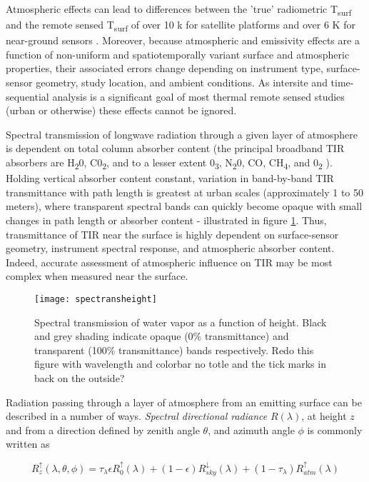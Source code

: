 Atmospheric effects can lead to differences between the 'true' radiometric T\textsubscript{surf} and the remote sensed T\textsubscript{surf} of over 10 k for satellite platforms \cite{Cooper1989} and over 6 K for near-ground sensors \cite{Meier2011}. Moreover, because atmospheric and emissivity effects are a function of non-uniform and spatiotemporally variant surface and atmospheric properties, their associated errors change depending on instrument type, surface-sensor geometry, study location, and ambient conditions. As intersite and time-sequential analysis is a significant goal of most thermal remote sensed studies (urban or otherwise) these effects cannot be ignored.

Spectral transmission of longwave radiation through a given layer of atmosphere is dependent on total column absorber content (the principal broadband TIR absorbers are H\textsubscript{2}0, C0\textsubscript{2}, and to a lesser extent 0\textsubscript{3}, N\textsubscript{2}0, CO, CH\textsubscript{4}, and 0\textsubscript{2} \cite{Miskolczi1993}). Holding vertical absorber content constant, variation in band-by-band TIR transmittance with path length is greatest at urban scales (approximately 1 to 50 meters), where transparent spectral bands can quickly become opaque with small changes in path length or absorber content - illustrated in figure \ref{spectransheight}. Thus, transmittance of TIR near the surface is highly dependent on surface-sensor geometry, instrument spectral response, and atmospheric absorber content. Indeed, accurate assessment of atmospheric influence on TIR may be most complex when measured near the surface.

\begin{figure}[H]
	\texttt{[image: spectransheight]}
	\caption{Spectral transmission of water vapor as a function of height. Black and grey shading indicate opaque (0\% transmittance) and transparent (100\% transmittance) bands respectively. Redo this figure with wavelength and colorbar no totle and the tick marks in back on the outside?}
	\label{spectransheight}
\end{figure}

Radiation passing through a layer of atmosphere from an emitting surface can be described in a number of ways. \textit{Spectral directional radiance} $ R (\lambda)$, at height $ z $ and from a direction defined by zenith angle \(\theta\), and azimuth angle \(\phi\) is commonly written as

\begin{equation}
R^\uparrow_z (\lambda, \theta, \phi) = \tau_\lambda \epsilon R^\uparrow_0(\lambda) + (1-\epsilon) R^\downarrow_{sky} (\lambda) + (1-\tau_\lambda) R^\uparrow_{atm}(\lambda)
\end{equation}

